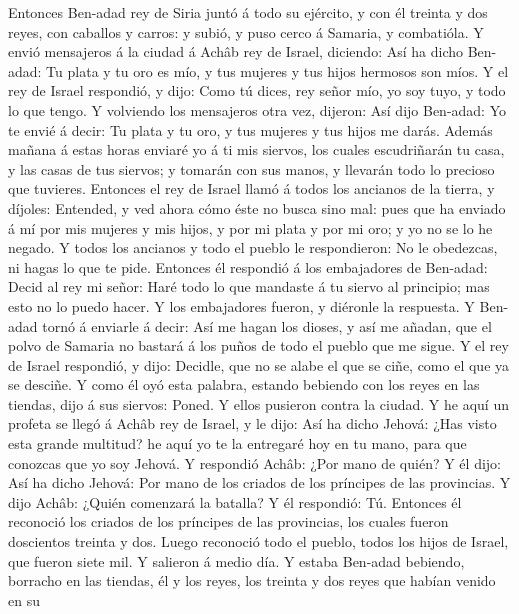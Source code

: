  Entonces Ben-adad rey de Siria juntó á todo su ejército,
y con él treinta y dos reyes, con caballos y carros: y subió, y puso
cerco á Samaria, y combatióla.  Y envió mensajeros á la
ciudad á Achâb rey de Israel, diciendo:  Así ha dicho
Ben-adad: Tu plata y tu oro es mío, y tus mujeres y tus hijos hermosos
son míos.  Y el rey de Israel respondió, y dijo: Como tú
dices, rey señor mío, yo soy tuyo, y todo lo que tengo.  Y
volviendo los mensajeros otra vez, dijeron: Así dijo Ben-adad: Yo te
envié á decir: Tu plata y tu oro, y tus mujeres y tus hijos me darás.
 Además mañana á estas horas enviaré yo á ti mis siervos,
los cuales escudriñarán tu casa, y las casas de tus siervos; y tomarán
con sus manos, y llevarán todo lo precioso que tuvieres. 
Entonces el rey de Israel llamó á todos los ancianos de la tierra, y
díjoles: Entended, y ved ahora cómo éste no busca sino mal: pues que ha
enviado á mí por mis mujeres y mis hijos, y por mi plata y por mi oro; y
yo no se lo he negado.  Y todos los ancianos y todo el
pueblo le respondieron: No le obedezcas, ni hagas lo que te pide.
 Entonces él respondió á los embajadores de Ben-adad:
Decid al rey mi señor: Haré todo lo que mandaste á tu siervo al
principio; mas esto no lo puedo hacer. Y los embajadores fueron, y
diéronle la respuesta.  Y Ben-adad tornó á enviarle á
decir: Así me hagan los dioses, y así me añadan, que el polvo de Samaria
no bastará á los puños de todo el pueblo que me sigue.  Y
el rey de Israel respondió, y dijo: Decidle, que no se alabe el que se
ciñe, como el que ya se desciñe.  Y como él oyó esta
palabra, estando bebiendo con los reyes en las tiendas, dijo á sus
siervos: Poned. Y ellos pusieron contra la ciudad.  Y he
aquí un profeta se llegó á Achâb rey de Israel, y le dijo: Así ha dicho
Jehová: ¿Has visto esta grande multitud? he aquí yo te la entregaré hoy
en tu mano, para que conozcas que yo soy Jehová.  Y
respondió Achâb: ¿Por mano de quién? Y él dijo: Así ha dicho Jehová: Por
mano de los criados de los príncipes de las provincias. Y dijo Achâb:
¿Quién comenzará la batalla? Y él respondió: Tú. 
Entonces él reconoció los criados de los príncipes de las provincias,
los cuales fueron doscientos treinta y dos. Luego reconoció todo el
pueblo, todos los hijos de Israel, que fueron siete mil. 
Y salieron á medio día. Y estaba Ben-adad bebiendo, borracho en las
tiendas, él y los reyes, los treinta y dos reyes que habían venido en su
